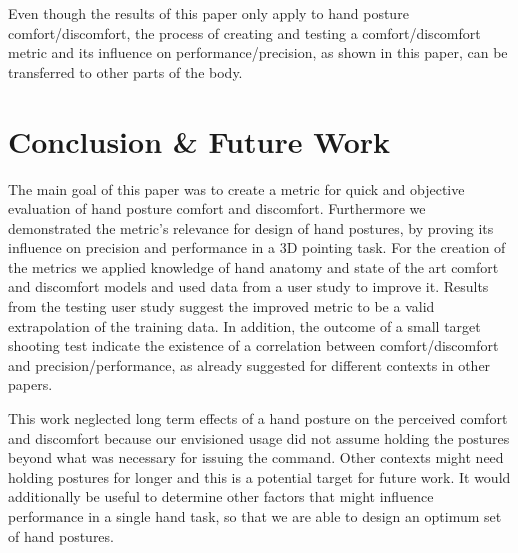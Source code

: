 \documentclass[headsepline,footsepline,footinclude=false,oneside,fontsize=11pt,paper=a4,listof=totoc,bibliography=totoc]{scrbook} %
\begin{document}
Even though the results of this paper only apply to hand posture comfort/discomfort, the process of creating and testing a comfort/discomfort metric and its influence on performance/precision, as shown in this paper, can be transferred to other parts of the body. 

\section{Conclusion \& Future Work}
The main goal of this paper was to create a metric for quick and objective evaluation of hand posture comfort and discomfort. Furthermore we demonstrated the metric's relevance for design of hand postures, by proving its influence on precision and performance in a 3D pointing task. For the creation of the metrics we applied knowledge of hand anatomy and state of the art comfort and discomfort models and used data from a user study to improve it. Results from the testing user study suggest the improved metric to be a valid extrapolation of the training data. In addition, the outcome of a small target shooting test indicate the existence of a correlation between comfort/discomfort and precision/performance, as already suggested for different contexts in other papers.

This work neglected long term effects of a hand posture on the perceived comfort and discomfort because our envisioned usage did not assume holding the postures beyond what was necessary for issuing the command. Other contexts might need holding postures for longer and this is a potential target for future work. It would additionally be useful to determine other factors that might influence performance in a single hand task, so that we are able to design an optimum set of hand postures.

\appendix{}

\listoffigures{}
\listoftables{}
\printbibliography{}
\end{document}
